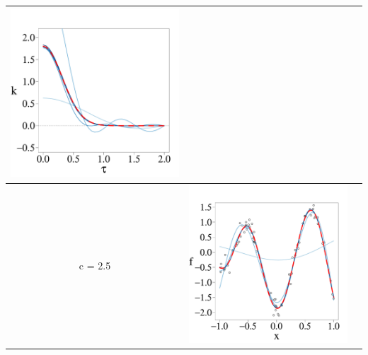 \documentclass[8pt]{beamer} %
\begin{document}
\begin{frame}
\begin{itemize}
\begin{adjustwidth}{-4.3em}{-3em}
\begin{tabular}{ c c c }
\includegraphics[scale=0.17, trim = 0mm 14mm 5mm 14mm, clip]{ch5_fig3_Cov_part5.pdf} & \\
\hline
c = 2.5 &
\includegraphics[scale=0.17, trim = 0mm 4mm 0mm 14mm, clip]{ch5_fig3_Post_part6.pdf}

\end{tabular}
\end{adjustwidth}
\end{itemize}
\end{frame}
\end{document}
